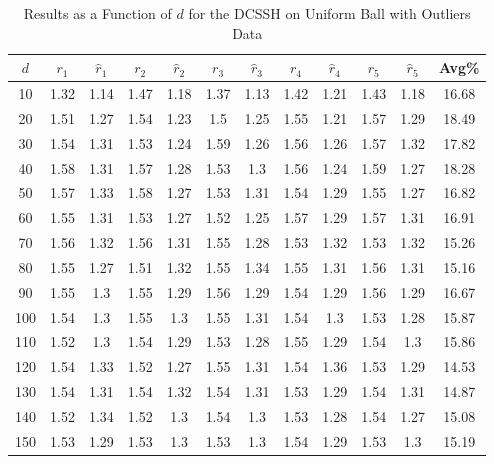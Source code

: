 \documentclass[11pt,twoside]{report}
\theoremstyle{definition}
\numberwithin{theorem}{section}
\numberwithin{definition}{section}
\numberwithin{lemma}{section}
\numberwithin{proposition}{section}
\numberwithin{equation}{section}
\numberwithin{figure}{section}
\begin{document}
\begin{appendices}
    \begin{table}[ht]
        \centering
        \begin{tabular}{|c||cc||cc||cc||cc||cc||c|} \hline
            $d$&$r_1$&$\hat{r}_1$&$r_2$&$\hat{r}_2$&$r_3$&$\hat{r}_3$&$r_4$&$\hat{r}_4$&$r_5$&$\hat{r}_5$&Avg\% \\ \hline
            10&1.32&1.14&1.47&1.18&1.37&1.13&1.42&1.21&1.43&1.18&16.68 \\
            20&1.51&1.27&1.54&1.23&1.5&1.25&1.55&1.21&1.57&1.29&18.49 \\
            30&1.54&1.31&1.53&1.24&1.59&1.26&1.56&1.26&1.57&1.32&17.82 \\
            40&1.58&1.31&1.57&1.28&1.53&1.3&1.56&1.24&1.59&1.27&18.28 \\
            50&1.57&1.33&1.58&1.27&1.53&1.31&1.54&1.29&1.55&1.27&16.82 \\
            60&1.55&1.31&1.53&1.27&1.52&1.25&1.57&1.29&1.57&1.31&16.91 \\
            70&1.56&1.32&1.56&1.31&1.55&1.28&1.53&1.32&1.53&1.32&15.26 \\
            80&1.55&1.27&1.51&1.32&1.55&1.34&1.55&1.31&1.56&1.31&15.16 \\
            90&1.55&1.3&1.55&1.29&1.56&1.29&1.54&1.29&1.56&1.29&16.67 \\
            100&1.54&1.3&1.55&1.3&1.55&1.31&1.54&1.3&1.53&1.28&15.87 \\
            110&1.52&1.3&1.54&1.29&1.53&1.28&1.55&1.29&1.54&1.3&15.86 \\
            120&1.54&1.33&1.52&1.27&1.55&1.31&1.54&1.36&1.53&1.29&14.53 \\
            130&1.54&1.31&1.54&1.32&1.54&1.31&1.53&1.29&1.54&1.31&14.87 \\
            140&1.52&1.34&1.52&1.3&1.54&1.3&1.53&1.28&1.54&1.27&15.08 \\
            150&1.53&1.29&1.53&1.3&1.53&1.3&1.54&1.29&1.53&1.3&15.19 \\ \hline
        \end{tabular}
        \caption{Results as a Function of $d$ for the DCSSH on Uniform Ball with Outliers Data}
        \label{tab:uniform_ball_with_outliers_dcssh_table_d}
    \end{table}
\end{appendices}
\end{document}
